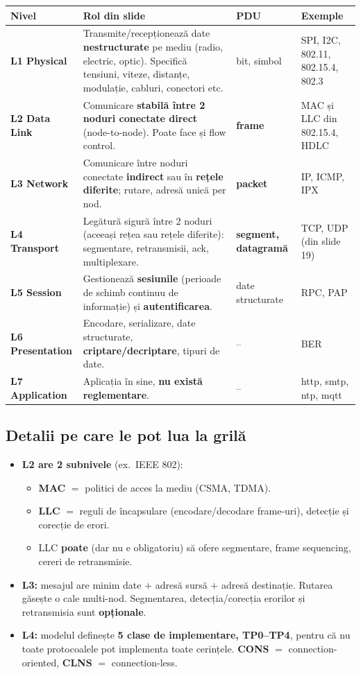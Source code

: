 \documentclass[11pt,a4paper]{article}
\begin{document}
\bigskip
\small
\renewcommand{\arraystretch}{1.35}
\begin{tabularx}{\linewidth}{@{}p{2.3cm} Y p{2.1cm} p{3.0cm}@{}}
\toprule
\textbf{Nivel} & \textbf{Rol din slide} & \textbf{PDU} & \textbf{Exemple}\\
\midrule
\textbf{L1 Physical} & Transmite/recepționează date \textbf{nestructurate} pe mediu (radio, electric, optic). Specifică tensiuni, viteze, distanțe, modulație, cabluri, conectori etc. & bit, simbol & SPI, I2C, 802.11, 802.15.4, 802.3\\
\textbf{L2 Data Link} & Comunicare \textbf{stabilă între 2 noduri conectate direct} (node-to-node). Poate face și flow control. & \textbf{frame} & MAC și LLC din 802.15.4, HDLC\\
\textbf{L3 Network} & Comunicare între noduri conectate \textbf{indirect} sau în \textbf{rețele diferite}; rutare, adresă unică per nod. & \textbf{packet} & IP, ICMP, IPX\\
\textbf{L4 Transport} & Legătură sigură între 2 noduri (aceeași rețea sau rețele diferite): segmentare, retransmisii, ack, multiplexare. & \textbf{segment, datagramă} & TCP, UDP (din slide 19)\\
\textbf{L5 Session} & Gestionează \textbf{sesiunile} (perioade de schimb continuu de informație) și \textbf{autentificarea}. & date structurate & RPC, PAP\\
\textbf{L6 Presentation} & Encodare, serializare, date structurate, \textbf{criptare/decriptare}, tipuri de date. & -- & BER\\
\textbf{L7 Application} & Aplicația în sine, \textbf{nu există reglementare}. & -- & http, smtp, ntp, mqtt\\
\bottomrule
\end{tabularx}
\normalsize

\subsection*{Detalii pe care le pot lua la grilă}
\begin{itemize}
  \item \textbf{L2 are 2 subnivele} (ex.\ IEEE 802):
  \begin{itemize}
    \item \textbf{MAC} $=$ politici de acces la mediu (CSMA, TDMA).
    \item \textbf{LLC} $=$ reguli de încapsulare (encodare/decodare frame-uri), detecție și corecție de erori.
    \item LLC \textbf{poate} (dar nu e obligatoriu) să ofere segmentare, frame sequencing, cereri de retransmisie.
  \end{itemize}
  \item \textbf{L3:} mesajul are minim date $+$ adresă sursă $+$ adresă destinație. Rutarea găsește o cale multi-nod. Segmentarea, detecția/corecția erorilor și retransmisia sunt \textbf{opționale}.
  \item \textbf{L4:} modelul definește \textbf{5 clase de implementare, TP0--TP4}, pentru că nu toate protocoalele pot implementa toate cerințele. \textbf{CONS} $=$ connection-oriented, \textbf{CLNS} $=$ connection-less.
\end{itemize}
\end{document}
